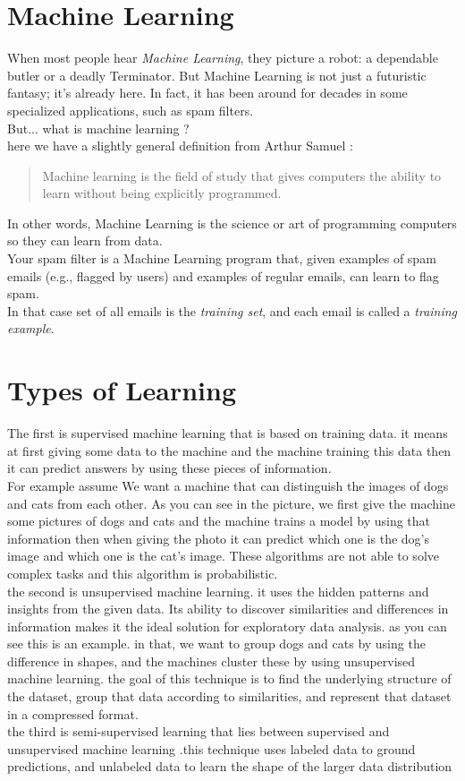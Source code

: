 \documentclass{SBCbookchapter}
\begin{document}
\section*{Machine Learning}
When most people hear \emph{Machine Learning}, they picture a robot: a dependable butler or a deadly Terminator.
But Machine Learning is not just a futuristic fantasy;
it’s already here. In fact, it has been around for decades 
in some specialized applications, such as spam filters. \\
But... what is machine learning ? \\
here we have a slightly general definition from Arthur Samuel :
\begin{quote}
Machine learning is the field of study that gives computers the ability to learn without being explicitly programmed.
\end{quote}
In other words, Machine Learning is the science or art of programming computers so they can learn from data.\\
Your spam filter is a Machine Learning
program that, given examples of spam
emails (e.g., flagged by users) and examples of regular emails,
can learn to flag spam.\\
In that case set of all emails is the \textit{training set}, and each email is called a \textit{training example}.
\section*{Types of Learning}
The first is supervised machine learning that is based on training data. it means at first giving some data to the machine and the machine training this data then it can predict answers by using these pieces of information.\\
For example assume We want a machine that can distinguish the images of dogs and cats from each other. As you can see in the picture, we first give the machine some pictures of dogs and cats and the machine trains a model by using that information then when giving the photo it can predict which one is the dog's image and which one is the cat's image. These algorithms are not able to solve complex tasks and this algorithm is probabilistic.
\\ the second is unsupervised machine learning. it uses the hidden patterns and insights from the given data. Its ability to discover similarities and differences in information makes it the ideal solution for exploratory data analysis. as you can see this is an example. in that, we want to group dogs and cats by using the difference in shapes, and the machines cluster these by using unsupervised machine learning.
the goal of this technique is to find the underlying structure of the dataset, group that data according to similarities, and represent that dataset in a compressed format.
\\ the third is semi-supervised learning that lies between supervised and unsupervised machine learning .this technique uses labeled data to ground predictions, and unlabeled data to learn the shape of the larger data distribution
\end{document}

